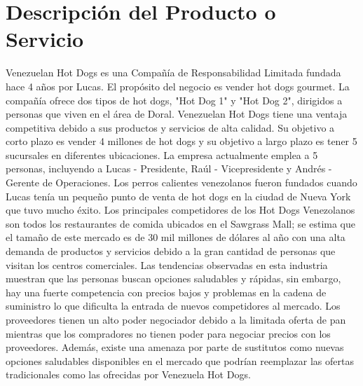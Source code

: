 \section{Descripción del Producto o Servicio} \label{sec:Descripción_del_Producto_o_Servicio}
Venezuelan Hot Dogs es una Compañía de Responsabilidad Limitada fundada hace 4 años por Lucas. El propósito del negocio es vender hot dogs gourmet. La compañía ofrece dos tipos de hot dogs, "Hot Dog 1" y "Hot Dog 2", dirigidos a personas que viven en el área de Doral. Venezuelan Hot Dogs tiene una ventaja competitiva debido a sus productos y servicios de alta calidad. Su objetivo a corto plazo es vender 4 millones de hot dogs y su objetivo a largo plazo es tener 5 sucursales en diferentes ubicaciones.
La empresa actualmente emplea a 5 personas, incluyendo a Lucas - Presidente, Raúl - Vicepresidente y Andrés - Gerente de Operaciones. Los perros calientes venezolanos fueron fundados cuando Lucas tenía un pequeño punto de venta de hot dogs en la ciudad de Nueva York que tuvo mucho éxito.
Los principales competidores de los Hot Dogs Venezolanos son todos los restaurantes de comida ubicados en el Sawgrass Mall; se estima que el tamaño de este mercado es de 30 mil millones de dólares al año con una alta demanda de productos y servicios debido a la gran cantidad de personas que visitan los centros comerciales. Las tendencias observadas en esta industria muestran que las personas buscan opciones saludables y rápidas, sin embargo, hay una fuerte competencia con precios bajos y problemas en la cadena de suministro lo que dificulta la entrada de nuevos competidores al mercado. Los proveedores tienen un alto poder negociador debido a la limitada oferta de pan mientras que los compradores no tienen poder para negociar precios con los proveedores. Además, existe una amenaza por parte de sustitutos como nuevas opciones saludables disponibles en el mercado que podrían reemplazar las ofertas tradicionales como las ofrecidas por Venezuela Hot Dogs.
